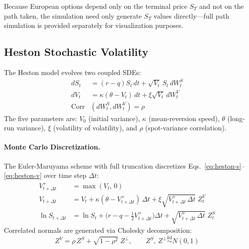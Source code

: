 \documentclass[12pt,a4paper]{article}
\begin{document}
Because European options depend only on the terminal price $S_T$ and not on the path taken, the simulation need only generate $S_T$ values directly---full path simulation is provided separately for visualization purposes.

\subsection{Heston Stochastic Volatility}

The Heston model \parencite{heston1993} evolves two coupled SDEs:
\begin{align}
dS_t &= (r - q)S_t\,dt + \sqrt{V_t}\,S_t\,dW_t^S \label{eq:heston-s}\\
dV_t &= \kappa(\theta - V_t)\,dt + \xi\sqrt{V_t}\,dW_t^V \label{eq:heston-v}\\
\text{Corr}&(dW_t^S, dW_t^V) = \rho \label{eq:heston-corr}
\end{align}
The five parameters are: $V_0$ (initial variance), $\kappa$ (mean-reversion speed), $\theta$ (long-run variance), $\xi$ (volatility of volatility), and $\rho$ (spot-variance correlation).

\paragraph{Monte Carlo Discretization.}
The Euler-Maruyama scheme with full truncation discretizes Eqs.~\eqref{eq:heston-s}--\eqref{eq:heston-v} over time step $\Delta t$:
\begin{align}
V_{t+\Delta t}^{+} &= \max(V_t,\, 0) \label{eq:heston-trunc}\\
V_{t+\Delta t} &= V_t + \kappa(\theta - V_{t+\Delta t}^{+})\,\Delta t + \xi\sqrt{V_{t+\Delta t}^{+}\,\Delta t}\;Z_t^V \label{eq:heston-euler-v}\\
\ln S_{t+\Delta t} &= \ln S_t + \bigl(r - q - \tfrac{1}{2}V_{t+\Delta t}^{+}\bigr)\Delta t + \sqrt{V_{t+\Delta t}^{+}\,\Delta t}\;Z_t^S \label{eq:heston-euler-s}
\end{align}
Correlated normals are generated via Cholesky decomposition:
\begin{equation}
Z^V = \rho\,Z^S + \sqrt{1-\rho^2}\;Z^{\perp}, \qquad Z^S,\,Z^{\perp} \stackrel{\text{iid}}{\sim} N(0,1)
\end{equation}
\end{document}
